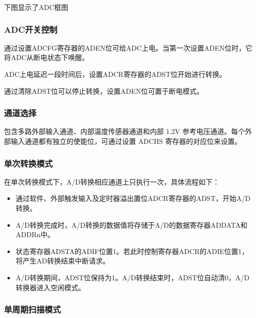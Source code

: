 

下图显示了ADC框图

\subsubsection{ADC开关控制}

通过设置ADCFG寄存器的ADEN位可给ADC上电。当第一次设置ADEN位时，它将ADC从断电状态下唤醒。

ADC上电延迟一段时间后，设置ADCR寄存器的ADST位开始进行转换。

通过清除ADST位可以停止转换，设置ADEN位可置于断电模式。

\subsubsection{通道选择}

包含多路外部输入通道、内部温度传感器通道和内部 1.2V 参考电压通道。每个外部输入通道都有独立的使能位，可通过设置 ADCHS 寄存器的对应位来设置。


\subsubsection{单次转换模式}

在单次转换模式下，A/D转换相应通道上只执行一次，具体流程如下：

\begin{itemize}
	\item{通过软件、外部触发输入及定时器溢出置位ADCR寄存器的ADST，开始A/D转换。}
	\item{A/D转换完成时，A/D转换的数据值将存储于A/D的数据寄存器ADDATA和ADDRn中。}
	\item{状态寄存器ADSTA的ADIF位置1。若此时控制寄存器ADCR的ADIE位置1，将产生AD转换结束中断请求。}
	\item{A/D转换期间，ADST位保持为1。A/D转换结束时，ADST位自动清0，A/D转换器进入空闲模式。}
\end{itemize}



\subsubsection{单周期扫描模式}


